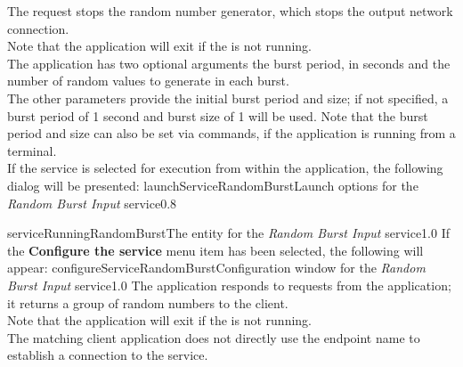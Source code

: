 The  request stops the random
number generator, which stops the output \yarp{} network connection.\\ 

Note that the application will exit if the  is not
running.\\

The application has two optional arguments \longDash{} the burst period, in seconds and
the number of random values to generate in each burst.
\insertAppParameters
{}
\insertInputServiceComment\\

The other parameters provide the initial burst period and size; if not specified, a burst
period of 1 second and burst size of 1 will be used.
Note that the burst period and size can also be set via commands, if the application is
running from a terminal.\\

\insertStandardServiceCommands
\condPage{}
If the service is selected for execution from within the \emph{\MMMU} application, the
following dialog will be presented:
%
{launchServiceRandomBurst}{Launch options for the \emph{Random Burst Input} service}{0.8}

%
{serviceRunningRandomBurst}{The \emph{\MMMU} entity for the \emph{Random Burst Input}
service}{1.0}
\condPage{}
If the \textbf{Configure the service} menu item has been selected, the following will
appear:
%
{configureServiceRandomBurst}{Configuration window for the \emph{Random Burst Input}
service}{1.0}
\condPage
{}
The  application responds to
 requests from the
 application; it returns a group of random
numbers to the client.\\

Note that the application will exit if the  is not
running.\\

\insertAutoAppParameters
{}
The matching client application does not directly use the endpoint name to establish a
connection to the service.\\

